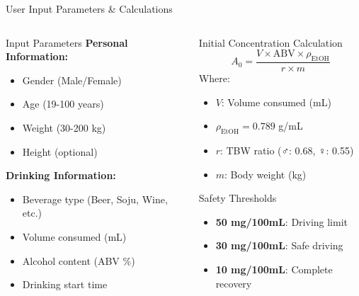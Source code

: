\documentclass[aspectratio=169]{beamer}
\newcommand{\safety}[1]{\textcolor{safety_green}{\textbf{#1}}}
\newcommand{\warning}[1]{\textcolor{warning_red}{\textbf{#1}}}
\begin{document}
\begin{frame}{User Input Parameters \& Calculations}
    \begin{columns}
        \begin{column}{0.5\textwidth}
            \begin{block}{Input Parameters}
                \textbf{Personal Information:}
                \begin{itemize}
                    \item Gender (Male/Female)
                    \item Age (19-100 years)
                    \item Weight (30-200 kg)
                    \item Height (optional)
                \end{itemize}
                
                \textbf{Drinking Information:}
                \begin{itemize}
                    \item Beverage type (Beer, Soju, Wine, etc.)
                    \item Volume consumed (mL)
                    \item Alcohol content (ABV \%)
                    \item Drinking start time
                \end{itemize}
            \end{block}
        \end{column}
        
        \begin{column}{0.5\textwidth}
            \begin{block}{Initial Concentration Calculation}
                \[
                A_0 = \frac{V \times \text{ABV} \times \rho_{\text{EtOH}}}{r \times m}
                \]
                Where:
                \begin{itemize}
                    \item $V$: Volume consumed (mL)
                    \item $\rho_{\text{EtOH}} = 0.789$ g/mL
                    \item $r$: TBW ratio (♂: 0.68, ♀: 0.55)
                    \item $m$: Body weight (kg)
                \end{itemize}
            \end{block}
              \begin{block}{Safety Thresholds}
                \begin{itemize}
                    \item \warning{50 mg/100mL}: Driving limit
                    \item \safety{30 mg/100mL}: Safe driving
                    \item \safety{10 mg/100mL}: Complete recovery
                \end{itemize}
            \end{block}
        \end{column}
    \end{columns}
\end{frame}
\end{document}
